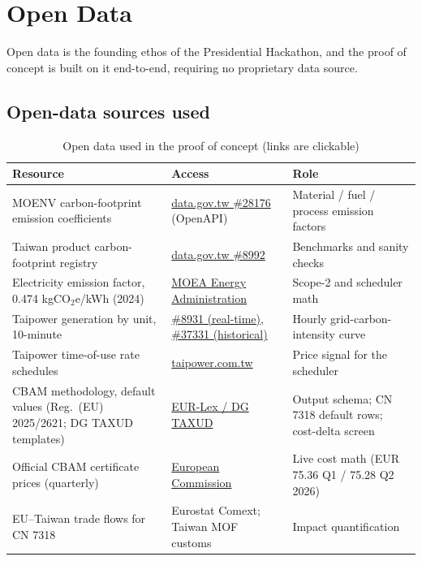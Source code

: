 \section{Open Data}\label{sec:opendata}

Open data is the founding ethos of the Presidential Hackathon, and the proof of
concept is built on it end-to-end, requiring no proprietary data source.

\subsection{Open-data sources used}\label{sec:used}

\begin{table}[htbp]
\caption{Open data used in the proof of concept (links are clickable)}
\label{tab:datasets}
\small
\begin{tabularx}{\textwidth}{@{}p{}p{}X@{}}
\toprule
\textbf{Resource} & \textbf{Access} & \textbf{Role} \\
\midrule
MOENV carbon-footprint emission coefficients & \href{https://data.gov.tw/en/datasets/28176}{data.gov.tw \#28176} (OpenAPI) & Material / fuel / process emission factors \\
Taiwan product carbon-footprint registry & \href{https://data.gov.tw/en/datasets/8992}{data.gov.tw \#8992} & Benchmarks and sanity checks \\
Electricity emission factor, 0.474 kgCO$_2$e/kWh (2024) & \href{https://www.moeaea.gov.tw/ECW/English/content/Content.aspx?menu_id=24200}{MOEA Energy Administration} & Scope-2 and scheduler math \\
Taipower generation by unit, 10-minute & \href{https://data.gov.tw/en/datasets/8931}{\#8931 (real-time)}, \href{https://data.gov.tw/en/datasets/37331}{\#37331 (historical)} & Hourly grid-carbon-intensity curve \\
Taipower time-of-use rate schedules & \href{https://www.taipower.com.tw/2764/2765/2801/}{taipower.com.tw} & Price signal for the scheduler \\
CBAM methodology, default values (Reg.\ (EU) 2025/2621; DG TAXUD templates) & \href{https://taxation-customs.ec.europa.eu/carbon-border-adjustment-mechanism_en}{EUR-Lex / DG TAXUD} & Output schema; CN 7318 default rows; cost-delta screen \\
Official CBAM certificate prices (quarterly) & \href{https://taxation-customs.ec.europa.eu/carbon-border-adjustment-mechanism/price-cbam-certificates_en}{European Commission} & Live cost math (EUR 75.36 Q1 / 75.28 Q2 2026) \\
EU--Taiwan trade flows for CN 7318 & Eurostat Comext; Taiwan MOF customs & Impact quantification \\
\bottomrule
\end{tabularx}
\end{table}

